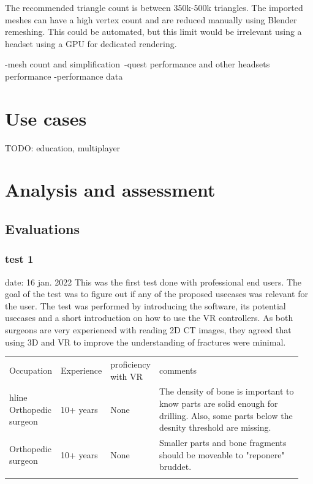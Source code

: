 \documentclass[a4paper]{report}
\begin{document}
The recommended triangle count is between 350k-500k triangles. The imported meshes can have a high vertex count and are reduced manually using Blender remeshing.
This could be automated, but this limit would be irrelevant using a headset using a GPU for dedicated rendering.


-mesh count and simplification\
-quest performance and other headsets performance
-performance data

\chapter{Use cases}\label{usecases}
TODO: education, multiplayer

\chapter{Analysis and assessment}\label{analysis and assessment}


\section{Evaluations}


\subsection{test 1}
date: 16 jan. 2022
This was the first test done with professional end users. The goal of the test was to figure out if any of the proposed usecases was relevant for the user. The test was performed by introducing the software, its potential usecases and a short introduction on how to use the VR controllers.
As both surgeons are very experienced with reading 2D CT images, they agreed that using 3D and VR to improve the understanding of fractures were minimal.

\begin{table}[ht]
\begin{tabular}{p{0.15\linewidth} |p{0.15\linewidth} |p{0.15\linewidth} | p{0.5\linewidth}}
Occupation         & Experience & proficiency with VR & comments                                                                                                                                \\hline
Orthopedic surgeon & 10+ years  & None                & The density of bone is important to know parts are solid enough for drilling. Also, some parts below the desnity threshold are missing. \\
Orthopedic surgeon & 10+ years  & None                & Smaller parts and bone fragments should be moveable to "reponere" bruddet.                                                              \\
                   &            &                     &
\end{tabular}
\end{table}
\end{document}
